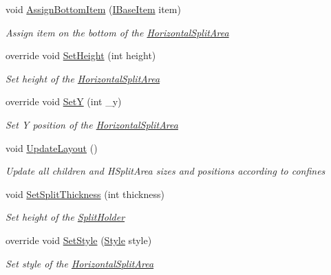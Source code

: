 \begin{DoxyCompactItemize}
void \mbox{\hyperlink{class_space_v_i_l_1_1_horizontal_split_area_afb64932a4d42c31805ba585fa4c0c703}{Assign\+Bottom\+Item}} (\mbox{\hyperlink{interface_space_v_i_l_1_1_core_1_1_i_base_item}{I\+Base\+Item}} item)
\begin{DoxyCompactList}\small\item\em Assign item on the bottom of the \mbox{\hyperlink{class_space_v_i_l_1_1_horizontal_split_area}{Horizontal\+Split\+Area}} \end{DoxyCompactList}\item 
override void \mbox{\hyperlink{class_space_v_i_l_1_1_horizontal_split_area_ab018f220de9d5f76f52d3068925d1bdf}{Set\+Height}} (int height)
\begin{DoxyCompactList}\small\item\em Set height of the \mbox{\hyperlink{class_space_v_i_l_1_1_horizontal_split_area}{Horizontal\+Split\+Area}} \end{DoxyCompactList}\item 
override void \mbox{\hyperlink{class_space_v_i_l_1_1_horizontal_split_area_a49f19dd9999b4ab40def3b69b2682973}{SetY}} (int \+\_\+y)
\begin{DoxyCompactList}\small\item\em Set Y position of the \mbox{\hyperlink{class_space_v_i_l_1_1_horizontal_split_area}{Horizontal\+Split\+Area}} \end{DoxyCompactList}\item 
void \mbox{\hyperlink{class_space_v_i_l_1_1_horizontal_split_area_a17787a6998374e9fea24a7a7a466be42}{Update\+Layout}} ()
\begin{DoxyCompactList}\small\item\em Update all children and H\+Split\+Area sizes and positions according to confines \end{DoxyCompactList}\item 
void \mbox{\hyperlink{class_space_v_i_l_1_1_horizontal_split_area_a3e8b87474ea53742d5a84513f8867d4d}{Set\+Split\+Thickness}} (int thickness)
\begin{DoxyCompactList}\small\item\em Set height of the \mbox{\hyperlink{class_space_v_i_l_1_1_split_holder}{Split\+Holder}} \end{DoxyCompactList}\item 
override void \mbox{\hyperlink{class_space_v_i_l_1_1_horizontal_split_area_a6731dd096f00f78595ea45d8993bc636}{Set\+Style}} (\mbox{\hyperlink{class_space_v_i_l_1_1_decorations_1_1_style}{Style}} style)
\begin{DoxyCompactList}\small\item\em Set style of the \mbox{\hyperlink{class_space_v_i_l_1_1_horizontal_split_area}{Horizontal\+Split\+Area}} \end{DoxyCompactList}\end{DoxyCompactItemize}
